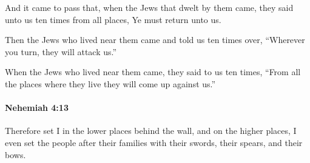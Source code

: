 			\begin{versebox}
					\item[BHS] 
					\item[LXX] 
					\item[ASV] And it came to pass that, when the Jews that dwelt by them came, they said unto us ten times from all places, Ye must return unto us.
					\item[NIV] Then the Jews who lived near them came and told us ten times over, “Wherever you turn, they will attack us.”
					\item[NRSV] When the Jews who lived near them came, they said to us ten times, “From all the places where they live they will come up against us.”
			\end{versebox}

		\paragraph{Nehemiah 4:13} %
			\label{NEHEMIAH-4-13}

			Therefore set I in the lower places behind the wall, and on the higher places, I even set the people after their families with their swords, their spears, and their bows.

